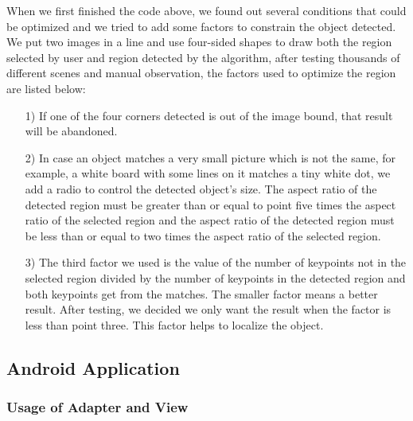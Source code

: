 \par When we first finished the code above, we found out several conditions that could be optimized and we tried to add some factors to constrain the object detected. We put two images in a line and use four-sided shapes to draw both the region selected by user and region detected by the algorithm, after testing thousands of different scenes and manual observation, the factors used to optimize the region are listed below:
\begin{enumerate}
\item[1)] If one of the four corners detected is out of the image bound, that result will be abandoned. 
\item[2)] In case an object matches a very small picture which is not the same, for example, a white board with some lines on it matches a tiny white dot, we add a radio to control the detected object's size. The aspect ratio of the detected region must be greater than or equal to point five times the aspect ratio of  the selected region and the aspect ratio of the detected region must be less than or equal to two times the aspect ratio of the selected region.
\item[3)] The third factor we used is the value of the number of keypoints not in the selected region divided by the number of keypoints in the detected region and both keypoints get from the matches. The smaller factor means a better result. After testing, we decided we only want the result when the factor is less than point three. This factor helps to localize the object.
\end{enumerate}

\subsection{Android Application}
\subsubsection{Usage of Adapter and View}
